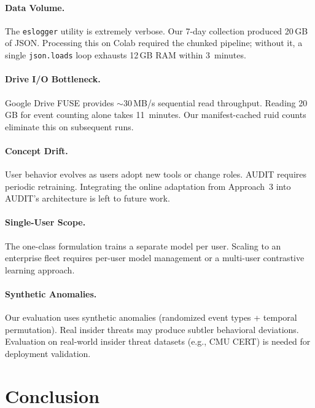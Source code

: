 \documentclass[letterpaper,twocolumn,10pt]{article}
\begin{document}
\paragraph{Data Volume.}
The \texttt{eslogger} utility is extremely verbose.  Our 7-day
collection produced 20\,GB of JSON.  Processing this on Colab
required the chunked pipeline; without it, a single
\texttt{json.loads} loop exhausts 12\,GB RAM within 3~minutes.

\paragraph{Drive I/O Bottleneck.}
Google Drive FUSE provides $\sim$30\,MB/s sequential read
throughput.  Reading 20\,GB for event counting alone takes
11~minutes.  Our manifest-cached ruid counts eliminate this on
subsequent runs.

\paragraph{Concept Drift.}
User behavior evolves as users adopt new tools or change roles.
AUDIT requires periodic retraining.  Integrating the online
adaptation from Approach~3 into AUDIT's architecture is left to
future work.

\paragraph{Single-User Scope.}
The one-class formulation trains a separate model per user.
Scaling to an enterprise fleet requires per-user model management
or a multi-user contrastive learning approach.

\paragraph{Synthetic Anomalies.}
Our evaluation uses synthetic anomalies (randomized event types +
temporal permutation).  Real insider threats may produce subtler
behavioral deviations.  Evaluation on real-world insider threat
datasets (e.g., CMU CERT) is needed for deployment validation.



\section{Conclusion}
\label{sec:conclusion}
\end{document}
